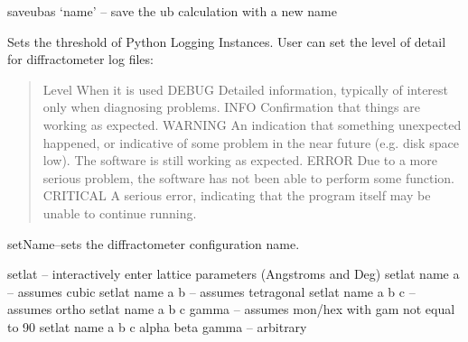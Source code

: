 \documentclass[letterpaper,10pt,english]{sphinxmanual}
\begin{document}

\begin{fulllineitems}
\label{Manual:commands.saveubas}
saveubas `name' -- save the ub calculation with a new name

\end{fulllineitems}


\begin{fulllineitems}
\label{Manual:commands.setLogLevel}
Sets the threshold of Python Logging Instances. User can set the level of detail
for diffractometer log files:
\begin{quote}

Level       When it is used
DEBUG       Detailed information, typically of interest only when diagnosing problems.
INFO        Confirmation that things are working as expected.
WARNING     An indication that something unexpected happened, or indicative of some problem in the near future (e.g. disk space low). The software is still working as expected.
ERROR       Due to a more serious problem, the software has not been able to perform some function.
CRITICAL    A serious error, indicating that the program itself may be unable to continue running.
\end{quote}

\end{fulllineitems}


\begin{fulllineitems}
\label{Manual:commands.setName}
setName--sets the diffractometer configuration name.

\end{fulllineitems}


\begin{fulllineitems}
\label{Manual:commands.setlat}
setlat  -- interactively enter lattice parameters (Angstroms and Deg)
setlat name a -- assumes cubic
setlat name a b -- assumes tetragonal
setlat name a b c -- assumes ortho
setlat name a b c gamma -- assumes mon/hex with gam not equal to 90
setlat name a b c alpha beta gamma -- arbitrary

\end{fulllineitems}
\end{document}
